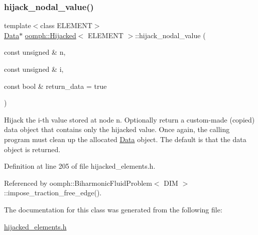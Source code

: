 \subsubsection{\texorpdfstring{hijack\+\_\+nodal\+\_\+value()}{hijack\_nodal\_value()}}
{\footnotesize\ttfamily template$<$class E\+L\+E\+M\+E\+NT$>$ \\
\hyperlink{classoomph_1_1Data}{Data}$\ast$ \hyperlink{classoomph_1_1Hijacked}{oomph\+::\+Hijacked}$<$ E\+L\+E\+M\+E\+NT $>$\+::hijack\+\_\+nodal\+\_\+value (\begin{DoxyParamCaption}\item[{const unsigned \&}]{n,  }\item[{const unsigned \&}]{i,  }\item[{const bool \&}]{return\+\_\+data = {\ttfamily true} }\end{DoxyParamCaption})\hspace{0.3cm}{\ttfamily [inline]}}



Hijack the i-\/th value stored at node n. Optionally return a custom-\/made (copied) data object that contains only the hijacked value. Once again, the calling program must clean up the allocated \hyperlink{classoomph_1_1Data}{Data} object. The default is that the data object is returned. 



Definition at line 205 of file hijacked\+\_\+elements.\+h.



Referenced by oomph\+::\+Biharmonic\+Fluid\+Problem$<$ D\+I\+M $>$\+::impose\+\_\+traction\+\_\+free\+\_\+edge().



The documentation for this class was generated from the following file\+:\begin{DoxyCompactItemize}
\item 
\hyperlink{hijacked__elements_8h}{hijacked\+\_\+elements.\+h}\end{DoxyCompactItemize}
